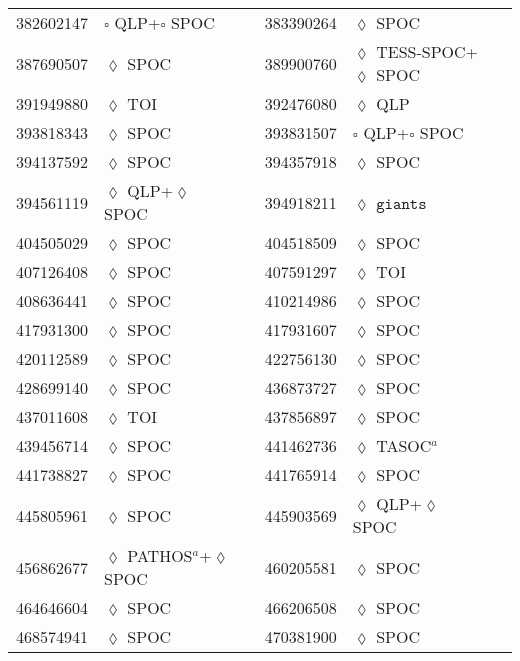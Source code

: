 \begin{longtable}{llrllr}
382602147 & $\square$ QLP+$\square$ SPOC & \cite{TIC_201177276} & 383390264 & $\lozenge$ SPOC & \cite{TIC_383390264} \\
387690507 & $\lozenge$ SPOC & \cite{TIC_387690507} & 389900760 & $\lozenge$ TESS-SPOC+$\lozenge$ SPOC & \cite{TIC_343628284} \\
391949880 & $\lozenge$ TOI & \cite{TIC_154872375} & 392476080 & $\lozenge$ QLP & \cite{TIC_392476080} \\
393818343 & $\lozenge$ SPOC & \cite{TIC_393818343} & 393831507 & $\square$ QLP+$\square$ SPOC & \cite{TIC_393831507} \\
394137592 & $\lozenge$ SPOC & \cite{TIC_394137592} & 394357918 & $\lozenge$ SPOC & \cite{TIC_441738827} \\
394561119 & $\lozenge$ QLP+$\lozenge$ SPOC & \cite{TIC_394561119} & 394918211 & $\lozenge$ $\texttt{giants}$ & \cite{TIC_394918211} \\
404505029 & $\lozenge$ SPOC & \cite{TIC_404505029} & 404518509 & $\lozenge$ SPOC & \cite{TIC_404518509} \\
407126408 & $\lozenge$ SPOC & \cite{TIC_428699140} & 407591297 & $\lozenge$ TOI & \cite{TIC_154872375} \\
408636441 & $\lozenge$ SPOC & \cite{TIC_408636441} & 410214986 & $\lozenge$ SPOC & \cite{TIC_410214986} \\
417931300 & $\lozenge$ SPOC & \cite{TIC_159418353} & 417931607 & $\lozenge$ SPOC & \cite{TIC_232540264} \\
420112589 & $\lozenge$ SPOC & \cite{TIC_420112589} & 422756130 & $\lozenge$ SPOC & \cite{TIC_422756130} \\
428699140 & $\lozenge$ SPOC & \cite{TIC_428699140} & 436873727 & $\lozenge$ SPOC & \cite{TIC_436873727} \\
437011608 & $\lozenge$ TOI & \cite{TIC_154872375} & 437856897 & $\lozenge$ SPOC & \cite{TIC_437856897} \\
439456714 & $\lozenge$ SPOC & \cite{TIC_439456714} & 441462736 & $\lozenge$ TASOC$^a$ & \cite{TIC_441462736} \\
441738827 & $\lozenge$ SPOC & \cite{TIC_441738827} & 441765914 & $\lozenge$ SPOC & \cite{TIC_232540264} \\
445805961 & $\lozenge$ SPOC & \cite{TIC_445805961} & 445903569 & $\lozenge$ QLP+$\lozenge$ SPOC & \cite{TIC_445903569} \\
456862677 & $\lozenge$ PATHOS$^a$+$\lozenge$ SPOC & \cite{TIC_456862677} & 460205581 & $\lozenge$ SPOC & \cite{TIC_460205581} \\
464646604 & $\lozenge$ SPOC & \cite{TIC_464646604} & 466206508 & $\lozenge$ SPOC & \cite{TIC_466206508} \\
468574941 & $\lozenge$ SPOC & \cite{TIC_376637093} & 470381900 & $\lozenge$ SPOC & \cite{TIC_470381900} \\


\end{longtable}
